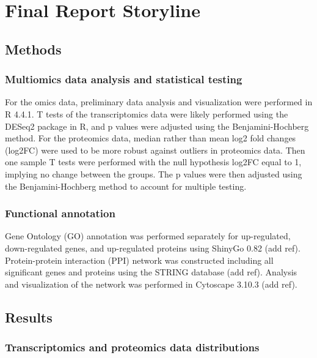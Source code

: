 \section{Final Report Storyline}\label{final-report-storyline}


\subsection{Methods}\label{methods}

\subsubsection{Multiomics data analysis and statistical
testing}\label{multiomics-data-analysis-and-statistical-testing}

For the omics data, preliminary data analysis and visualization were
performed in R 4.4.1. T tests of the transcriptomics data were likely
performed using the DESeq2 package in R, and p values were adjusted
using the Benjamini-Hochberg method. For the proteomics data, median
rather than mean log2 fold changes (log2FC) were used to be more robust
against outliers in proteomics data. Then one sample T tests were
performed with the null hypothesis log2FC equal to 1, implying no change
between the groups. The p values were then adjusted using the
Benjamini-Hochberg method to account for multiple testing.

\subsubsection{Functional annotation}\label{functional-annotation}

Gene Ontology (GO) annotation was performed separately for up-regulated,
down-regulated genes, and up-regulated proteins using ShinyGo 0.82 (add
ref). Protein-protein interaction (PPI) network was constructed
including all significant genes and proteins using the STRING database
(add ref). Analysis and visualization of the network was performed in
Cytoscape 3.10.3 (add ref).

\subsection{Results}\label{results}

\subsubsection{Transcriptomics and proteomics data
distributions}\label{transcriptomics-and-proteomics-data-distributions}

